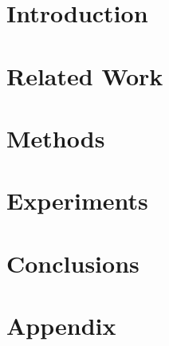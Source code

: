 \documentclass[letter,11pt]{article}
\theoremstyle{plain}
\theoremstyle{definition}
\theoremstyle{plain}
\theoremstyle{definition}
\begin{document}
	\label{abs_lbl}
	
	
	\section{Introduction}
	\label{intro_lbl}
	
	
	\section{Related Work}
	\label{related_lbl}
	
	
	\section{Methods}
	\label{methods_lbl}
	
	
	\section{Experiments}
	\label{experiments_lbl}
	
	
	\section{Conclusions}
	\label{conclusions_lbl}
	

	\label{references_lbl}
	
	
	\pagebreak
	\section{Appendix}
	\label{appendix_lbl}
	
\end{document}
